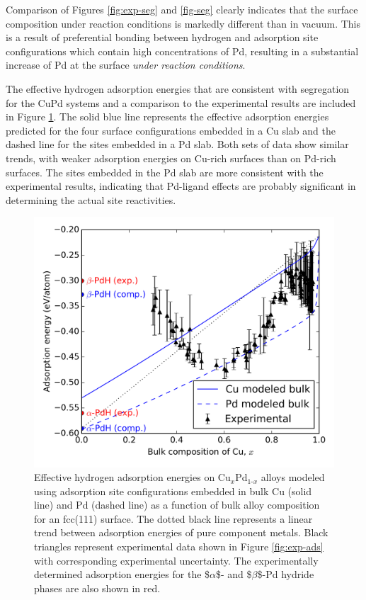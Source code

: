 \documentclass[12pt]{cmuthesis}
\begin{document}
Comparison of Figures \ref{fig:exp-seg} and \ref{fig-seg} clearly indicates that the surface composition under reaction conditions is markedly different than in vacuum. This is a result of preferential bonding between hydrogen and adsorption site configurations which contain high concentrations of Pd, resulting in a substantial increase of Pd at the surface \emph{under reaction conditions}.

The effective hydrogen adsorption energies that are consistent with segregation for the CuPd systems and a comparison to the experimental results are included in Figure \ref{fig-results}. The solid blue line represents the effective adsorption energies predicted for the four surface configurations embedded in a Cu slab and the dashed line for the sites embedded in a Pd slab. Both sets of data show similar trends, with weaker adsorption energies on Cu-rich surfaces than on Pd-rich surfaces. The sites embedded in the Pd slab are more consistent with the experimental results, indicating that Pd-ligand effects are probably significant in determining the actual site reactivities.

\begin{figure}[h]
\centering
\includegraphics[width=5in]{./images/results.png}
\caption{Effective hydrogen adsorption energies on Cu\(_x\)Pd\(_{\text{1-}x}\) alloys modeled using adsorption site configurations embedded in bulk Cu (solid line) and Pd (dashed line) as a function of bulk alloy composition for an fcc(111) surface. The dotted black line represents a linear trend between adsorption energies of pure component metals. Black triangles represent experimental data shown in Figure \ref{fig:exp-ads} with corresponding experimental uncertainty. The experimentally determined adsorption energies for the \$\(\alpha\)\$- and \$\(\beta\)\$-Pd hydride phases are also shown in red. \label{fig-results}}
\end{figure}
\end{document}
